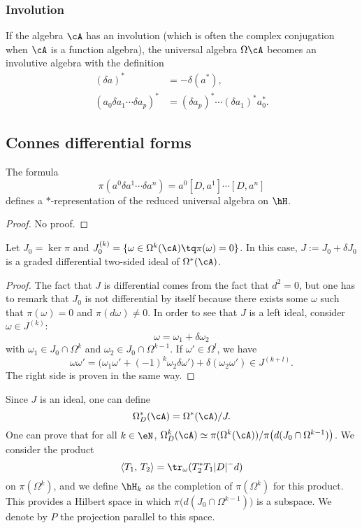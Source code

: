 \subsubsection{Involution}

If the algebra $\cA$ has an involution (which is often the complex conjugation when $\cA$ is a function algebra), the universal algebra $\Omega\cA$ becomes an involutive algebra with the definition
\begin{align*}
(\delta a)^*&=-\delta(a^*),\\
(a_0\delta a_1\cdots\delta a_p)^*&=(\delta a_p)^*\cdots(\delta a_1)^*a_0^*.
\end{align*}


\subsection{Connes differential forms}

\begin{proposition}
The formula
\[ 
  \pi(a^0\delta a^1\cdots \delta a^{n})=a^0[D,a^1]\cdots[D,a^{n}]
\]
defines a $*$-representation of the reduced universal algebra on $\hH$.
\end{proposition}
\begin{proof}
No proof.
\end{proof}

\begin{proposition}
Let $J_0=\ker\pi$ and $J_0^{(k)}=\{ \omega\in\Omega^k(\cA)\tq \pi(\omega)=0 \}$. In this case, $J:=J_0+\delta J_0$ is a graded differential two-sided ideal of $\Omega^*(\cA)$.
\end{proposition}

\begin{proof}
The fact that $J$ is differential comes from the fact that $d^2=0$, but one has to remark that $J_0$ is not differential by itself because there exists some  $\omega$ such that $\pi(\omega)=0$ and $\pi(d\omega)\neq 0$. In order to see that $J$ is a left ideal, consider $\omega\in J^{(k)}$:
\[ 
  \omega=\omega_1+\delta\omega_2
\]
with $\omega_1\in J_0\cap\Omega^k$ and $\omega_2\in J_0\cap\Omega^{k-1}$. If $\omega'\in\Omega^l$, we have
\[ 
  \omega\omega'=\big( \omega_1\omega'+(-1)^k\omega_2\delta\omega' \big)+\delta(\omega_2\omega')\in J^{(k+l)}.
\]
The right side is proven in the same way.
\end{proof}

Since $J$ is an ideal, one can define
\[ 
  \Omega^*_D(\cA)=\Omega^*(\cA)/J.
\]
One can prove that for all $k\in\eN$, $\Omega^k_D(\cA)\simeq \pi(\Omega^k(\cA))/\pi\big( d(J_0\cap\Omega^{k-1}) \big)$. We consider the product 
\begin{equation}
	\langle T_1,\,T_2\rangle=\tr_{\omega}(T_2^*T_1| D |^-d)
\end{equation}
on $\pi(\Omega^k)$, and we define $\hH_k$ as the completion of $\pi(\Omega^k)$ for this product. This provides a Hilbert space in which $\pi\big( d(J_0\cap\Omega^{k-1}) \big)$ is a subspace. We denote by $P$ the projection parallel to this space.

